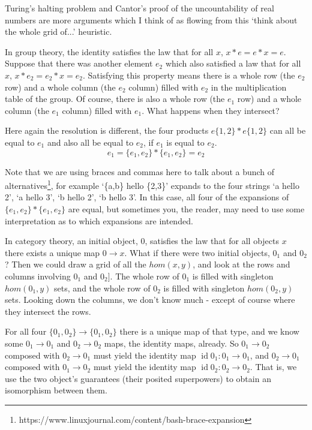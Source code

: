 \documentclass{proc-l}
\theoremstyle{definition}
\theoremstyle{remark}
\numberwithin{equation}{section}
\begin{document}
Turing's halting problem and Cantor's proof of the uncountability of real numbers are
more arguments which I think of as flowing from this `think about the whole grid of...'
heuristic.

In group theory, the identity satisfies the law that for all \(x\), \(x * e = e * x = e\).
Suppose that there was another element \(e_2\) which also satisfied a law that for all \(x\), \(x * e_2 = e_2 * x = e_2\).
Satisfying this property means there is a whole row (the \(e_2\) row) and a whole column (the \(e_2\) column) filled with \(e_2\) in the multiplication table of the group.
Of course, there is also a whole row (the \(e_1\) row) and a whole column (the \(e_1\) column) filled with \(e_1\).
What happens when they intersect?

Here again the resolution is different, the four products \(e\{1,2\} * e\{1,2\}\) can all be equal to \(e_1\) and also all be equal to \(e_2\), if \(e_1\) is equal to \(e_2\).
\[
e_1 = \{e_1, e_2\} * \{e_1,e_2\} = e_2
\]

Note that we are using braces and commas here to talk about a bunch of alternatives\footnote{https://www.linuxjournal.com/content/bash-brace-expansion}, for example `\{a,b\} hello \{2,3\}' expands to
the four strings `a hello 2', `a hello 3', `b hello 2', `b hello 3'. In this case, all four of the expansions of \(\{e_1, e_2\} * \{e_1,e_2\}\) are equal, but sometimes you, the reader, may need to use some interpretation as to which expansions are intended.

In category theory, an initial object, 0,  satisfies the law that for all objects \(x\) there exists a unique map \(0 \to x\). What if there were two initial objects, \(0_1\) and \(0_2\)?
Then we could draw a grid of all the \(hom(x, y)\), and look at the rows and columns involving \(0_1\) and \(0_2]\).
The whole row of \(0_1\) is filled with singleton \(hom(0_1, y)\) sets,
and the whole row of \(0_2\) is filled with singleton \(hom(0_2, y)\) sets.
Looking down the columns, we don't know much - except of course where they intersect the rows.

For all four \(\{0_1,0_2\} \to \{0_1,0_2\}\) there is a unique map of that type,
and we know some \(0_1\to0_1\) and \(0_2\to0_2\) maps, the identity maps, already.
So \(0_1\to 0_2\) composed with \(0_2 \to 0_1\) must yield the identity map \(\operatorname{id} 0_1 : 0_1 \to 0_1\),
and \(0_2 \to 0_1\) composed with \(0_1 \to 0_2\) must yield the identity map \(\operatorname{id} 0_2 : 0_2 \to 0_2\).
That is, we use the two object's guarantees (their posited superpowers) to obtain an isomorphism between them.
\end{document}
